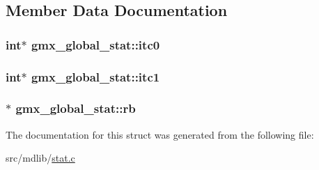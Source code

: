 \subsection{\-Member \-Data \-Documentation}
\hypertarget{structgmx__global__stat_af8451acf59c6c85e84ae637675f2d993}{
\subsubsection[{itc0}]{\setlength{\rightskip}{0pt plus 5cm}int$\ast$ {\bf gmx\-\_\-global\-\_\-stat\-::itc0}}}\label{structgmx__global__stat_af8451acf59c6c85e84ae637675f2d993}
\hypertarget{structgmx__global__stat_a8daa312fcc0b6c1382a97f934d11e368}{
\subsubsection[{itc1}]{\setlength{\rightskip}{0pt plus 5cm}int$\ast$ {\bf gmx\-\_\-global\-\_\-stat\-::itc1}}}\label{structgmx__global__stat_a8daa312fcc0b6c1382a97f934d11e368}
\hypertarget{structgmx__global__stat_a25195b3ee6f215973db11c6eeee7d171}{
\subsubsection[{rb}]{$\ast$ {\bf gmx\-\_\-global\-\_\-stat\-::rb}}}\label{structgmx__global__stat_a25195b3ee6f215973db11c6eeee7d171}


\-The documentation for this struct was generated from the following file\-:\begin{DoxyCompactItemize}
\item 
src/mdlib/\hyperlink{stat_8c}{stat.\-c}\end{DoxyCompactItemize}

